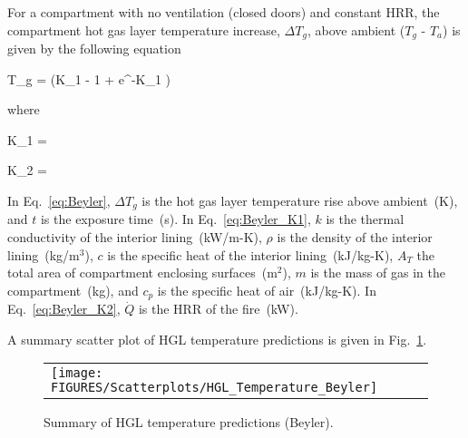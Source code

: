 For a compartment with no ventilation (closed doors) and constant HRR, the compartment hot gas layer temperature increase, $\Delta T_g$, above ambient ($T_g$ - $T_a$) is given by the following equation

\be
\Delta T_g =  (K_1  - 1 + e^{-K_1 })
\label{eq:Beyler}
\ee

\noindent where

\be
K_1 = 
\label{eq:Beyler_K1}
\ee

\be
K_2 = 
\label{eq:Beyler_K2}
\ee

In Eq.~\ref{eq:Beyler}, $\Delta T_g$ is the hot gas layer temperature rise above ambient~(K), and $t$ is the exposure time~(s). In Eq.~\ref{eq:Beyler_K1}, $k$ is the thermal conductivity of the interior lining~(kW/m-K), $\rho$ is the density of the interior lining~(kg/m$^3$), $c$ is the specific heat of the interior lining~(kJ/kg-K), $A_T$ the total area of compartment enclosing surfaces~(m$^2$), $m$ is the mass of gas in the compartment~(kg), and $c_p$ is the specific heat of air~(kJ/kg-K). In Eq.~\ref{eq:Beyler_K2}, $\dot Q$ is the HRR of the fire~(kW).

\clearpage

A summary scatter plot of HGL temperature predictions is given in Fig.~\ref{hgl_temperature_beyler_summary}. 

\begin{figure}[ht]
\begin{center}
\begin{tabular}{l}
\texttt{[image: FIGURES/Scatterplots/HGL\_Temperature\_Beyler]}
\end{tabular}
\end{center}
\caption[Summary of HGL temperature predictions (Beyler).]
{Summary of HGL temperature predictions (Beyler).}
\label{hgl_temperature_beyler_summary}
\end{figure}

